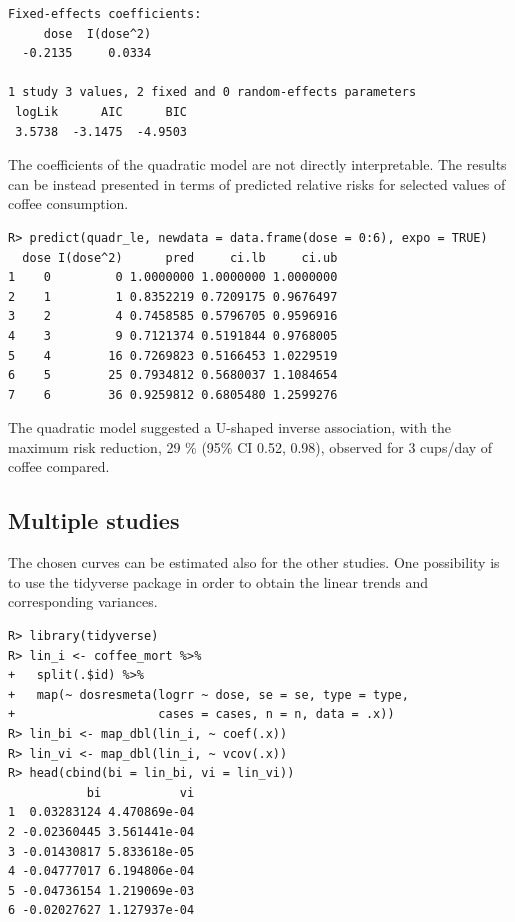 \documentclass[11pt,a4paper,twoside,openany]{book}\usepackage{knitr}
\newcommand{\pkg}[1]{{\fontseries{b}\selectfont #1}}
\begin{document}
{{\begin{knitrout}
\begin{kframe}
\begin{verbatim}
Fixed-effects coefficients:
     dose  I(dose^2)  
  -0.2135     0.0334  

1 study 3 values, 2 fixed and 0 random-effects parameters
 logLik      AIC      BIC  
 3.5738  -3.1475  -4.9503  
\end{verbatim}
\end{kframe}
\end{knitrout}

\noindent The coefficients of the quadratic model are not directly interpretable. The results can be instead presented in terms of predicted relative risks for selected values of coffee consumption.
\begin{knitrout}\footnotesize
{}\color{fgcolor}\begin{kframe}
\begin{verbatim}
R> predict(quadr_le, newdata = data.frame(dose = 0:6), expo = TRUE)
  dose I(dose^2)      pred     ci.lb     ci.ub
1    0         0 1.0000000 1.0000000 1.0000000
2    1         1 0.8352219 0.7209175 0.9676497
3    2         4 0.7458585 0.5796705 0.9596916
4    3         9 0.7121374 0.5191844 0.9768005
5    4        16 0.7269823 0.5166453 1.0229519
6    5        25 0.7934812 0.5680037 1.1084654
7    6        36 0.9259812 0.6805480 1.2599276
\end{verbatim}
\end{kframe}
\end{knitrout}


\noindent The quadratic model suggested a U-shaped inverse association, with the maximum risk reduction, 29 \% (95\% CI 0.52, 0.98), observed for 3 cups/day of coffee compared.

\subsection{Multiple studies}

The chosen curves can be estimated also for the other studies. One possibility is to use the \pkg{tidyverse} package \citep{tidyverse} in order to obtain the linear trends and corresponding variances.

\begin{knitrout}\footnotesize
{}\color{fgcolor}\begin{kframe}
\begin{verbatim}
R> library(tidyverse)
R> lin_i <- coffee_mort %>%
+   split(.$id) %>%
+   map(~ dosresmeta(logrr ~ dose, se = se, type = type,
+                    cases = cases, n = n, data = .x))
R> lin_bi <- map_dbl(lin_i, ~ coef(.x))
R> lin_vi <- map_dbl(lin_i, ~ vcov(.x))
R> head(cbind(bi = lin_bi, vi = lin_vi))
           bi           vi
1  0.03283124 4.470869e-04
2 -0.02360445 3.561441e-04
3 -0.01430817 5.833618e-05
4 -0.04777017 6.194806e-04
5 -0.04736154 1.219069e-03
6 -0.02027627 1.127937e-04
\end{verbatim}
\end{kframe}
\end{knitrout}

}}
\end{document}
